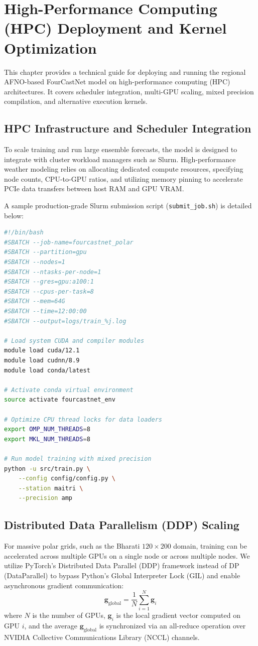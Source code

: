 \documentclass[12pt,titlepage,a4paper]{report}
\begin{document}
\chapter{High-Performance Computing (HPC) Deployment and Kernel Optimization}
This chapter provides a technical guide for deploying and running the regional AFNO-based FourCastNet model on high-performance computing (HPC) architectures. It covers scheduler integration, multi-GPU scaling, mixed precision compilation, and alternative execution kernels.

\section{HPC Infrastructure and Scheduler Integration}
To scale training and run large ensemble forecasts, the model is designed to integrate with cluster workload managers such as Slurm. High-performance weather modeling relies on allocating dedicated compute resources, specifying node counts, CPU-to-GPU ratios, and utilizing memory pinning to accelerate PCIe data transfers between host RAM and GPU VRAM.

A sample production-grade Slurm submission script (\texttt{submit\_job.sh}) is detailed below:
\begin{lstlisting}[language=bash, caption=Slurm Job Submission Script for FourCastNet Training]
#!/bin/bash
#SBATCH --job-name=fourcastnet_polar
#SBATCH --partition=gpu
#SBATCH --nodes=1
#SBATCH --ntasks-per-node=1
#SBATCH --gres=gpu:a100:1
#SBATCH --cpus-per-task=8
#SBATCH --mem=64G
#SBATCH --time=12:00:00
#SBATCH --output=logs/train_%j.log

# Load system CUDA and compiler modules
module load cuda/12.1
module load cudnn/8.9
module load conda/latest

# Activate conda virtual environment
source activate fourcastnet_env

# Optimize CPU thread locks for data loaders
export OMP_NUM_THREADS=8
export MKL_NUM_THREADS=8

# Run model training with mixed precision
python -u src/train.py \
    --config config/config.py \
    --station maitri \
    --precision amp
\end{lstlisting}

\section{Distributed Data Parallelism (DDP) Scaling}
For massive polar grids, such as the Bharati $120 \times 200$ domain, training can be accelerated across multiple GPUs on a single node or across multiple nodes. We utilize PyTorch's Distributed Data Parallel (DDP) framework instead of DP (DataParallel) to bypass Python's Global Interpreter Lock (GIL) and enable asynchronous gradient communication:
\begin{equation}
    \mathbf{g}_{\text{global}} = \frac{1}{N} \sum_{i=1}^{N} \mathbf{g}_i
\end{equation}
where $N$ is the number of GPUs, $\mathbf{g}_i$ is the local gradient vector computed on GPU $i$, and the average $\mathbf{g}_{\text{global}}$ is synchronized via an all-reduce operation over NVIDIA Collective Communications Library (NCCL) channels.
\end{document}

